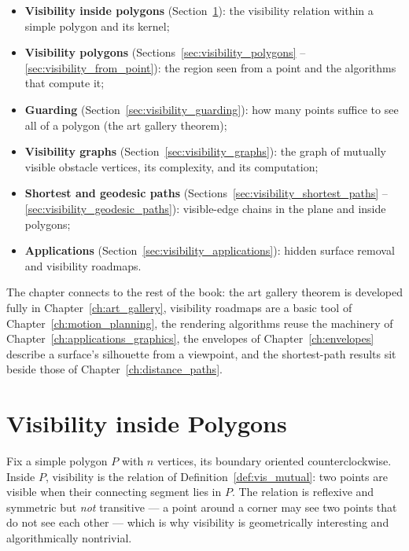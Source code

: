 \begin{itemize}
  \item \textbf{Visibility inside polygons} (Section~\ref{sec:visibility_in_polygons}):
    the visibility relation within a simple polygon and its kernel;
  \item \textbf{Visibility polygons} (Sections~\ref{sec:visibility_polygons}
    --\ref{sec:visibility_from_point}): the region seen from a point and the
    algorithms that compute it;
  \item \textbf{Guarding} (Section~\ref{sec:visibility_guarding}): how many
    points suffice to see all of a polygon (the art gallery theorem);
  \item \textbf{Visibility graphs} (Section~\ref{sec:visibility_graphs}): the
    graph of mutually visible obstacle vertices, its complexity, and its
    computation;
  \item \textbf{Shortest and geodesic paths} (Sections~\ref{sec:visibility_shortest_paths}
    --\ref{sec:visibility_geodesic_paths}): visible-edge chains in the plane
    and inside polygons;
  \item \textbf{Applications} (Section~\ref{sec:visibility_applications}):
    hidden surface removal and visibility roadmaps.
\end{itemize}

The chapter connects to the rest of the book: the art gallery theorem is
developed fully in Chapter~\ref{ch:art_gallery}, visibility roadmaps are a
basic tool of Chapter~\ref{ch:motion_planning}, the rendering algorithms
reuse the machinery of Chapter~\ref{ch:applications_graphics}, the
envelopes of Chapter~\ref{ch:envelopes} describe a surface's silhouette
from a viewpoint, and the shortest-path results sit beside those of
Chapter~\ref{ch:distance_paths}.

\section{Visibility inside Polygons}
\label{sec:visibility_in_polygons}

Fix a simple polygon $P$ with $n$ vertices, its boundary oriented
counterclockwise. Inside $P$, visibility is the relation of
Definition~\ref{def:vis_mutual}: two points are visible when their
connecting segment lies in $P$. The relation is reflexive and symmetric but
\emph{not} transitive --- a point around a corner may see two points that do
not see each other --- which is why visibility is geometrically interesting
and algorithmically nontrivial.

